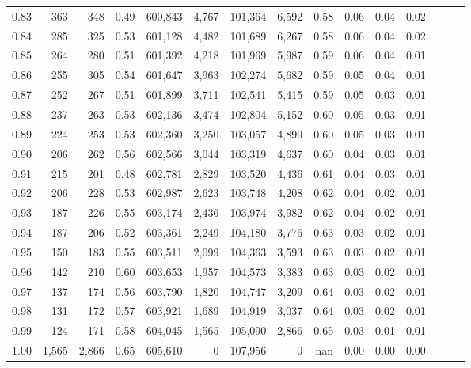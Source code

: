 \begin{tabular}{rrrrrrrrrrrrrrr}
0.83 &     363 &    348 &  0.49 &  600,843 &    4,767 &  101,364 &    6,592 &  0.58 &  0.06 &  0.04 &      0.02 \\
0.84 &     285 &    325 &  0.53 &  601,128 &    4,482 &  101,689 &    6,267 &  0.58 &  0.06 &  0.04 &      0.02 \\
0.85 &     264 &    280 &  0.51 &  601,392 &    4,218 &  101,969 &    5,987 &  0.59 &  0.06 &  0.04 &      0.01 \\
0.86 &     255 &    305 &  0.54 &  601,647 &    3,963 &  102,274 &    5,682 &  0.59 &  0.05 &  0.04 &      0.01 \\
0.87 &     252 &    267 &  0.51 &  601,899 &    3,711 &  102,541 &    5,415 &  0.59 &  0.05 &  0.03 &      0.01 \\
0.88 &     237 &    263 &  0.53 &  602,136 &    3,474 &  102,804 &    5,152 &  0.60 &  0.05 &  0.03 &      0.01 \\
0.89 &     224 &    253 &  0.53 &  602,360 &    3,250 &  103,057 &    4,899 &  0.60 &  0.05 &  0.03 &      0.01 \\
0.90 &     206 &    262 &  0.56 &  602,566 &    3,044 &  103,319 &    4,637 &  0.60 &  0.04 &  0.03 &      0.01 \\
0.91 &     215 &    201 &  0.48 &  602,781 &    2,829 &  103,520 &    4,436 &  0.61 &  0.04 &  0.03 &      0.01 \\
0.92 &     206 &    228 &  0.53 &  602,987 &    2,623 &  103,748 &    4,208 &  0.62 &  0.04 &  0.02 &      0.01 \\
0.93 &     187 &    226 &  0.55 &  603,174 &    2,436 &  103,974 &    3,982 &  0.62 &  0.04 &  0.02 &      0.01 \\
0.94 &     187 &    206 &  0.52 &  603,361 &    2,249 &  104,180 &    3,776 &  0.63 &  0.03 &  0.02 &      0.01 \\
0.95 &     150 &    183 &  0.55 &  603,511 &    2,099 &  104,363 &    3,593 &  0.63 &  0.03 &  0.02 &      0.01 \\
0.96 &     142 &    210 &  0.60 &  603,653 &    1,957 &  104,573 &    3,383 &  0.63 &  0.03 &  0.02 &      0.01 \\
0.97 &     137 &    174 &  0.56 &  603,790 &    1,820 &  104,747 &    3,209 &  0.64 &  0.03 &  0.02 &      0.01 \\
0.98 &     131 &    172 &  0.57 &  603,921 &    1,689 &  104,919 &    3,037 &  0.64 &  0.03 &  0.02 &      0.01 \\
0.99 &     124 &    171 &  0.58 &  604,045 &    1,565 &  105,090 &    2,866 &  0.65 &  0.03 &  0.01 &      0.01 \\
1.00 &   1,565 &  2,866 &  0.65 &  605,610 &        0 &  107,956 &        0 &   nan &  0.00 &  0.00 &      0.00 \\
\bottomrule
\end{tabular}

